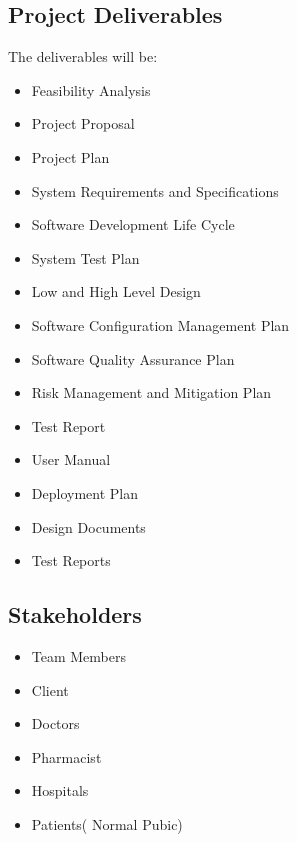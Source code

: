 \documentclass[
10pt, %
a4paper, %
oneside, %
headinclude,footinclude, %
BCOR5mm, %
]{scrartcl}
\begin{document}
\subsection{ Project Deliverables}

The deliverables will be:
\begin{itemize}
    

\item 	Feasibility Analysis
\item 	Project Proposal 
\item 	Project Plan
\item 	System Requirements and Specifications
\item 	Software Development Life Cycle

\item 	System Test Plan
\item 	Low and High Level Design
\item 	Software Configuration Management Plan
\item 	Software Quality Assurance Plan
\item 	Risk Management and Mitigation Plan

\item 	Test Report

\item 	User Manual

\item 	Deployment Plan



\item 	Design Documents
\item 	Test Reports

\end{itemize}
 



\subsection{ Stakeholders}
\begin{itemize}
    


\item Team Members
\item Client
\item Doctors
\item Pharmacist
\item Hospitals
\item Patients( Normal Pubic)

\end{itemize}
\end{document}
